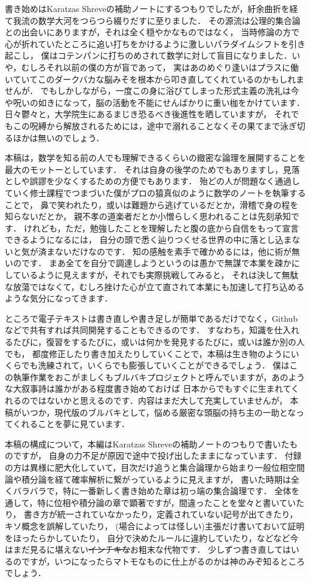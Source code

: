 
書き始めはKaratzas Shreveの補助ノートにするつもりでしたが，紆余曲折を経て我流の数学大河をつらつら綴りだすに至りました．
その源流は公理的集合論との出会いにありますが，それは全く穏やかなものではなく，
当時修論の方で心が折れていたところに追い打ちをかけるように激しいパラダイムシフトを引き起こし，
僕はコテンパンに打ちのめされて数学に対して盲目になりました．いや，むしろそれ以前の僕の方が盲であって，
実はあのめぐり逢いはプラスに働いていてこのダークバカな脳みそを根本から叩き直してくれているのかもしれませんが．
でもしかしながら，一度この身に浴びてしまった形式主義の洗礼は今や呪いの如きになって，脳の活動を不能にせんばかりに重い枷をかけています．
日々鬱々と，大学院生にあるまじき恐るべき後進性を晒していますが，
それでもこの呪縛から解放されるためには，途中で溺れることなくその果てまで泳ぎ切るほかは無いのでしょう．

本稿は，数学を知る前の人でも理解できるくらいの緻密な論理を展開することを最大のモットーとしています．
それは自身の後学のためでもありますし，見落としや誤謬を少なくするための方便でもあります．
殆どの人が問題なく通過していく修士課程でつまづいた僕がプロの猿真似のように数学のノートを執筆することで，
鼻で笑われたり，或いは難題から逃げているだとか，滑稽で身の程を知らないだとか，
親不孝の道楽者だとか小憎らしく思われることは先刻承知です．
けれども，ただ，勉強したことを理解したと腹の底から自信をもって宣言できるようになるには，
自分の頭で悉く辿りつくせる世界の中に落とし込まないと気が済まないだけなのです．
知の感触を素手で確かめるには，他に術が無いのです．
まあ全てを自分で調達しようというのは愚かで無謀で本業を疎かにしているように見えますが，それでも実際挑戦してみると，
それは決して無駄な放蕩ではなくて，むしろ挫けた心が立て直されて本業にも加速して打ち込めるような気分になってきます．

ところで電子テキストは書き直しや書き足しが簡単であるだけでなく，Githubなどで共有すれば共同開発することもできるのです．
すなわち，知識を仕入れるたびに，復習をするたびに，或いは何かを発見するたびに，或いは誰か別の人でも，
都度修正したり書き加えたりしていくことで，本稿は生き物のようにいくらでも洗練されて，いくらでも膨張していくことができるでしょう．
僕はこの執筆作業をおこがましくもブルバキプロジェクトと呼んでいますが，あのような大叙事詩は誰かがある程度書き始めておけば
日本からでもすぐに生まれてくれるのではないかと思えるのです．内容はまだ大して充実していませんが，
本稿がいつか，現代版のブルバキとして，悩める厳密な頭脳の持ち主の一助となってくれることを夢に見ています．

本稿の構成について，本編はKaratzas Shreveの補助ノートのつもりで書いたものですが，
自身の力不足が原因で途中で投げ出したままになっています．
付録の方は異様に肥大化していて，目次だけ追うと集合論理から始まり一般位相空間論や積分論を経て確率解析に繋がっているように見えますが，
書いた時期は全くバラバラで，特に一番新しく書き始めた章は初っ端の集合論理です．
全体を通して，特に位相や積分論の章で顕著ですが，間違ったことを堂々と書いていたり，
書き方が統一されていなかったり，定義されていない記号が出てきたり，キソ概念を誤解していたり，
(場合によっては怪しい)主張だけ書いておいて証明をほったらかしていたり，
自分で決めたルールに違約していたり，などなど今はまだ見るに堪えない\sout{インチキな}お粗末な代物です．
少しずつ書き直してはいるのですが，いつになったらマトモなものに仕上がるのかは神のみぞ知るところでしょう．


